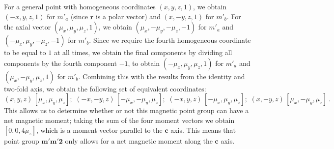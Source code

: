 For a general point with homogeneous coordinates $(x,y,z,1)$, we obtain $(-x,y,z,1)$ for $m'_a$ (since $\mathbf{r}$ is a polar vector) and $(x,-y,z,1)$ for $m'_b$.  For the axial vector $(\mu_x,\mu_y,\mu_z,1)$, we obtain $(\mu_x,-\mu_y,-\mu_z,-1)$ for $m'_a$ and $(-\mu_x,\mu_y,-\mu_z,-1)$ for $m'_b$. Since we require the fourth homogeneous coordinate to be equal to $1$ at all times, we obtain the final components by dividing all components by the fourth component $-1$, to obtain $(-\mu_x,\mu_y,\mu_z,1)$ for $m'_a$ and $(\mu_x,-\mu_y,\mu_z,1)$ for $m'_b$. Combining this with the results from the identity and two-fold axis, we obtain the following set of equivalent coordinates:
{\small\begin{equation*}
	(x,y,z)\,[\mu_x,\mu_y,\mu_z];\,\, (-x,-y,z)\,[-\mu_x,-\mu_y,\mu_z];\,\, (-x,y,z)\, [-\mu_x,\mu_y,\mu_z]; \,\, (x,-y,z)\,[\mu_x,-\mu_y,\mu_z]\ .
\end{equation*}}
This allows us to determine whether or not this magnetic point group can have a net magnetic moment; taking the sum of the four moment vectors we obtain $[0,0,4\mu_z]$, which is a moment vector parallel to the $\mathbf{c}$ axis.  This means that point group $\mathbf{m'm'2}$ only allows for a net magnetic moment along the $\mathbf{c}$ axis.

